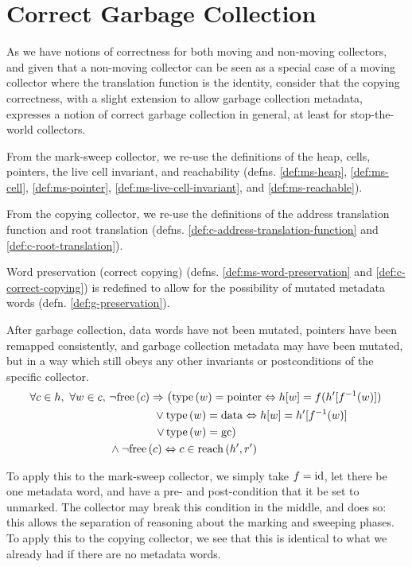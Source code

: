 \section{Correct Garbage Collection}
\label{sec:gc-correct}

As we have notions of correctness for both moving and non-moving
collectors, and given that a non-moving collector can be seen as a
special case of a moving collector where the translation function is
the identity, consider that the copying correctness, with a slight
extension to allow garbage collection metadata, expresses a notion of
correct garbage collection in general, at least for stop-the-world
collectors.

From the mark-sweep collector, we re-use the definitions of the heap,
cells, pointers, the live cell invariant, and reachability
(defns. \ref{def:ms-heap}, \ref{def:ms-cell}, \ref{def:ms-pointer},
\ref{def:ms-live-cell-invariant}, and \ref{def:ms-reachable}).

From the copying collector, we re-use the definitions of the address
translation function and root translation
(defns. \ref{def:c-address-translation-function} and
\ref{def:c-root-translation}).

Word preservation (correct copying)
(defns. \ref{def:ms-word-preservation} and
\ref{def:c-correct-copying}) is redefined to allow for the possibility
of mutated metadata words (defn. \ref{def:g-preservation}).

\begin{definition}[Preservation]
  \label{def:g-preservation}
  After garbage collection, data words have not been mutated, pointers
  have been remapped consistently, and garbage collection metadata may
  have been mutated, but in a way which still obeys any other
  invariants or postconditions of the specific collector.
  \begin{align*}
    \forall c \in h,\ \forall w \in c,\ &\lnot\mathrm{free}\left(c\right) \Rightarrow
    \left(\mathrm{type}\left(w\right) = \mathrm{pointer} \Leftrightarrow h[w] = f(h'[f^{-1}(w)])\right.\\
    &\quad\quad\quad\quad \lor \mathrm{type}\left(w\right) = \mathrm{data}
    \Leftrightarrow h[w] = h'[f^{-1}(w)]\\
    &\quad\quad\quad\quad \left.\lor\thinspace\mathrm{type}\left(w\right) = \mathrm{gc}\right)\\
    &\land \lnot\mathrm{free}\left(c\right) \Leftrightarrow c \in \mathrm{reach}\left(h', r'\right)
  \end{align*}
\end{definition}

To apply this to the mark-sweep collector, we simply take $f = \mathrm{id}$,
let there be one metadata word, and have a pre- and post-condition
that it be set to unmarked. The collector may break this condition in
the middle, and does so: this allows the separation of reasoning about
the marking and sweeping phases. To apply this to the copying
collector, we see that this is identical to what we already had if
there are no metadata words.

